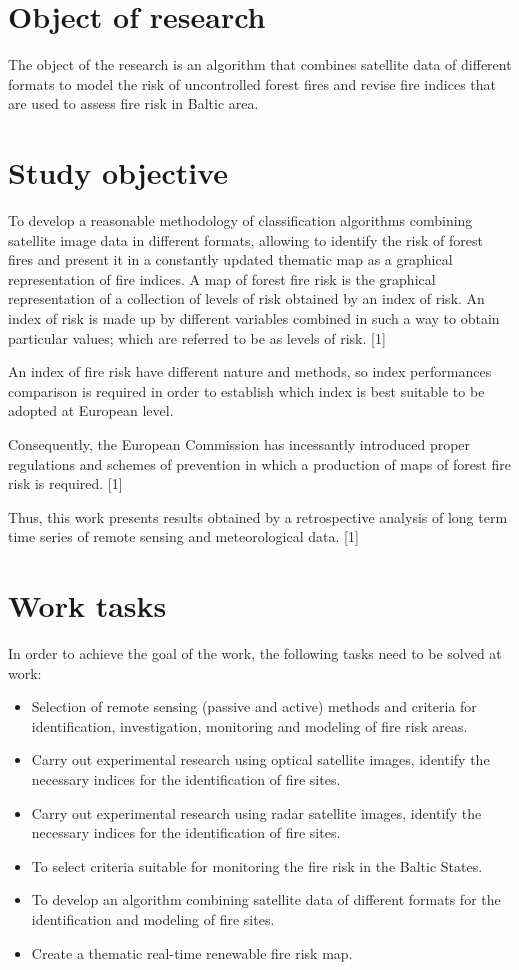 \section{Object of research}
	The object of the research is an algorithm that combines satellite data of different formats to model the risk of uncontrolled forest fires and revise fire indices that are used to assess fire risk in Baltic area.

\section{Study objective}
	To develop a reasonable methodology of classification algorithms combining satellite image data in different formats, allowing to identify the risk of forest fires and present it in a constantly updated thematic map as a graphical representation of fire indices. A map of forest fire risk is the graphical representation of a collection of levels of risk obtained by an
	index of risk. An index of risk is made up by different variables combined in such a way to obtain particular values; which are referred to be as levels of risk. [1] 
	
	An index of fire risk have different nature and methods, so index performances comparison is required in order to establish which index is best suitable to be adopted at European level.
	
	Consequently, the European Commission has incessantly introduced proper regulations and schemes of prevention in which a production of maps of forest fire risk is required. [1]
	
	Thus, this work presents results obtained by a
	retrospective analysis of long term time series of remote sensing and meteorological data. [1]

\section{Work tasks}
	In order to achieve the goal of the work, the following tasks need to be solved at work:
\begin{itemize}
	\item Selection of remote sensing (passive and active) methods and criteria for identification, investigation, monitoring and modeling of fire risk areas.
	\item Carry out experimental research using optical satellite images, identify the necessary indices for the identification of fire sites.
	\item Carry out experimental research using radar satellite images, identify the necessary indices for the identification of fire sites.
	\item To select criteria suitable for monitoring the fire risk in the Baltic States.
	\item To develop an algorithm combining satellite data of different formats for the identification and modeling of fire sites.
	\item Create a thematic real-time renewable fire risk map.
\end{itemize}

